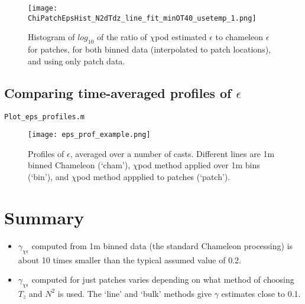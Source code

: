 \documentclass[11pt]{article}
\begin{document}
\begin{figure}[htbp]
\texttt{[image: ChiPatchEpsHist\_N2dTdz\_line\_fit\_minOT40\_usetemp\_1.png]}
\caption{Histogram of $log_{10}$ of the ratio of $\chi$pod estimated $\epsilon$ to chameleon $\epsilon$ for patches, for both binned data (interpolated to patch locations), and using only patch data.}
\label{epscomphist}
\end{figure}




\subsection{Comparing time-averaged profiles of $\epsilon$}

\verb+Plot_eps_profiles.m+



\begin{figure}[htbp]
\texttt{[image: eps\_prof\_example.png]}
\caption{Profiles of $\epsilon$, averaged over a number of casts. Different lines are 1m binned Chameleon (`cham'), $\chi$pod method applied over 1m bins (`bin'), and $\chi$pod method appplied to patches (`patch').}
\label{}
\end{figure}





\clearpage
\section{Summary}

\begin{itemize}
\item $\gamma_{\chi\epsilon}$ computed from 1m binned data (the standard Chameleon processing) is about 10 times smaller than the typical assumed value of 0.2.
\item $\gamma_{\chi\epsilon}$ computed for just patches varies depending on what method of choosing $T_z$ and $N^2$ is used. The `line' and `bulk' methods give $\gamma$ estimates close to 0.1. 
\end{itemize}
\end{document}
